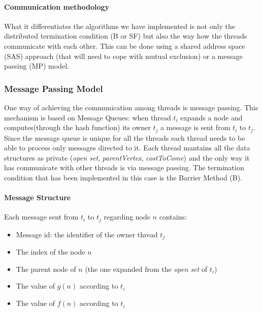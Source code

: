 \documentclass[twocolumn, switch]{article} %
\begin{document}
\paragraph{Communication methodology}
What it differentiates the algorithms we have implemented is not only
the distributed termination condition (B or SF) but also the way how the threads
communicate with each other. This can be done using a shared address space (SAS) approach (that will
need to cope with mutual exclusion) or a message passing (MP) model.
\subsubsection{Message Passing Model}
One way of achieving the communication among threads is message passing. This mechanism is based
on Message Queues: when thread $t_i$ expands a node and computes(through the hash function) 
its owner $t_j$ a message is sent from $t_i$ to $t_j$. Since the message
queue is unique for all the threads each thread needs to be able to process
only messages directed to it. Each thread mantains all the data structures as private (\textit{open set},
\textit{parentVertex}, \textit{costToCome}) and the only way it has communicate with other threads
is via message passing. The termination condition that has been implemented in this case is the Barrier Method (B).
\paragraph{Message Structure} Each message sent from $t_i$ to $t_j$ regarding node $n$ contains:
\begin{itemize}
  \item Message id: the identifier of the owner thread $t_j$
  \item The index of the node $n$
  \item The parent node of $n$ (the one expanded from the \textit{open set} of $t_i$)
  \item The value of $g(n)$ according to $t_i$
  \item The value of $f(n)$ according to $t_i$
\end{itemize}
\end{document}
